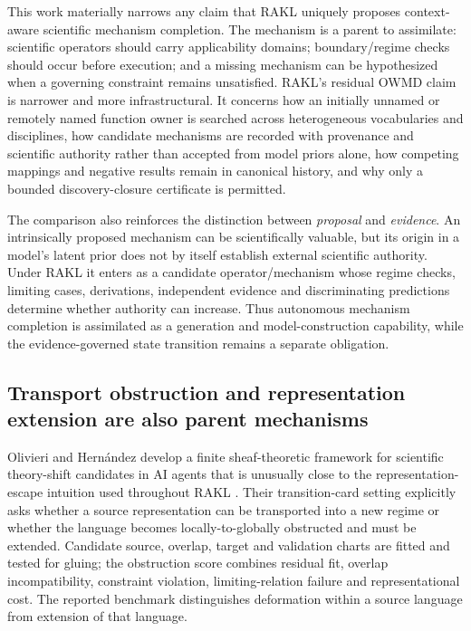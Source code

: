 \documentclass[11pt]{article}
\begin{document}
This work materially narrows any claim that RAKL uniquely proposes context-aware scientific mechanism completion. The mechanism is a parent to assimilate: scientific operators should carry applicability domains; boundary/regime checks should occur before execution; and a missing mechanism can be hypothesized when a governing constraint remains unsatisfied. RAKL's residual OWMD claim is narrower and more infrastructural. It concerns how an initially unnamed or remotely named function owner is searched across heterogeneous vocabularies and disciplines, how candidate mechanisms are recorded with provenance and scientific authority rather than accepted from model priors alone, how competing mappings and negative results remain in canonical history, and why only a bounded discovery-closure certificate is permitted.

The comparison also reinforces the distinction between \emph{proposal} and \emph{evidence}. An intrinsically proposed mechanism can be scientifically valuable, but its origin in a model's latent prior does not by itself establish external scientific authority. Under RAKL it enters as a candidate operator/mechanism whose regime checks, limiting cases, derivations, independent evidence and discriminating predictions determine whether authority can increase. Thus autonomous mechanism completion is assimilated as a generation and model-construction capability, while the evidence-governed state transition remains a separate obligation.

\subsection{Transport obstruction and representation extension are also parent mechanisms}

Olivieri and Hern\'andez develop a finite sheaf-theoretic framework for scientific theory-shift candidates in AI agents that is unusually close to the representation-escape intuition used throughout RAKL \cite{olivieri2026theoryshift}. Their transition-card setting explicitly asks whether a source representation can be transported into a new regime or whether the language becomes locally-to-globally obstructed and must be extended. Candidate source, overlap, target and validation charts are fitted and tested for gluing; the obstruction score combines residual fit, overlap incompatibility, constraint violation, limiting-relation failure and representational cost. The reported benchmark distinguishes deformation within a source language from extension of that language.
\end{document}
